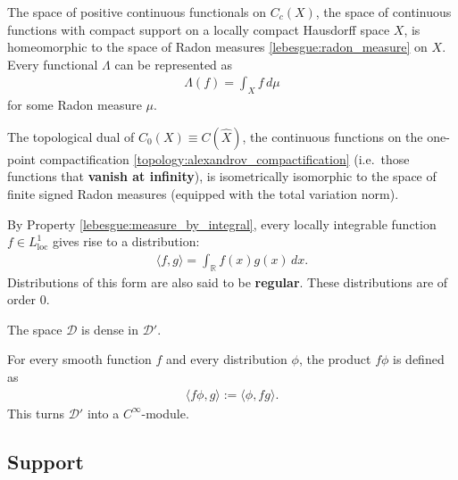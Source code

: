     \begin{theorem}\label{distributions:riesz_markov}
        The space of positive continuous functionals on $C_c(X)$, the space of continuous functions with compact support on a locally compact Hausdorff space $X$, is homeomorphic to the space of Radon measures \ref{lebesgue:radon_measure} on $X$. Every functional $\Lambda$ can be represented as
        \begin{gather}
            \Lambda(f) = \int_Xf\,d\mu
        \end{gather}
        for some Radon measure $\mu$.

        The topological dual of $C_0(X)\equiv C(\widehat{X})$, the continuous functions on the one-point compactification \ref{topology:alexandrov_compactification} (i.e.~those functions that \textbf{vanish at infinity}), is isometrically isomorphic to the space of finite signed Radon measures (equipped with the total variation norm).
    \end{theorem}

    \begin{example}\label{distributions:ordinary_function}
       	By Property \ref{lebesgue:measure_by_integral}, every locally integrable function $f\in L^1_\mathrm{loc}$ gives rise to a distribution:
       	\begin{gather}
   	    	\langle f,g \rangle = \int_\mathbb{R}f(x)g(x)\,dx.
       	\end{gather}
       Distributions of this form are also said to be \textbf{regular}. These distributions are of order 0.
   	\end{example}

    \begin{property}
        The space $\mathcal{D}$ is dense in $\mathcal{D}'$.
    \end{property}
    \begin{property}
        For every smooth function $f$ and every distribution $\phi$, the product $f\phi$ is defined as
        \begin{gather}
            \langle f\phi,g \rangle := \langle\phi,fg\rangle.
        \end{gather}
        This turns $\mathcal{D}'$ into a $C^\infty$-module.
    \end{property}

\subsection{Support}

